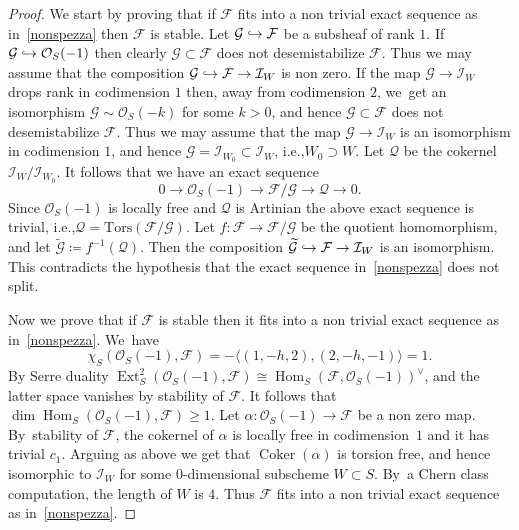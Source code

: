 \documentclass[11pt]{article}
\newcommand{\ie}{i.e.,\xspace}
\newcommand\hto{\mathrel{\lhook\joinrel\to}}
\newcommand\cF{\mathcal{F}}
\newcommand\cG{\mathcal{G}}
\newcommand\cI{\mathcal{I}}
\newcommand\cO{\mathcal{O}}
\newcommand\cQ{\mathcal{Q}}
\DeclareMathOperator{\coker}{Coker}
\DeclareMathOperator{\Ext}{Ext}
\DeclareMathOperator{\Hom}{Hom}
\let\hra\hto
\let\la\langle
\let\wt\widetilde
\theoremstyle{definition}
\begin{document}
\begin{proof}
We start by proving that if $\cF$ fits into a non trivial exact sequence as in~\eqref{nonspezza} then $\cF$ is stable. Let $\cG\hra\cF$ be a subsheaf of rank $1$. If
$\cG\hra\cO_S(-1)$ then clearly $\cG\subset\cF$ does not desemistabilize $\cF$. Thus we may assume that the composition
$\cG\hra\cF\to \cI_W$ is non zero. If the map $\cG\to \cI_W$ drops rank in codimension $1$ then, away from codimension $2$, we~get an isomorphism $\cG\sim\cO_S(-k)$ for some $k>0$, and hence $\cG\subset\cF$ does not desemistabilize $\cF$. Thus we may assume that the map $\cG\to \cI_W$ is an isomorphism in codimension $1$, and hence $\cG=\cI_{W_0}\subset \cI_W$, \ie $W_0\supset W$. Let $\cQ$ be the cokernel $\cI_W/ \cI_{W_0}$. It follows that we have an exact sequence
\begin{equation*}
0\to\cO_S(-1)\to\cF/\cG\to \cQ\to 0.
\end{equation*}
Since $\cO_S(-1)$ is locally free and $\cQ$ is Artinian the above exact sequence is trivial, \ie $\cQ=\mathrm{Tors}(\cF/\cG)$. Let $f\colon\cF\to \cF/\cG$ be the quotient homomorphism, and let $\wt{\cG}\coloneqq f^{-1}(\cQ)$. Then the composition
$\wt{\cG}\hra\cF\to \cI_W$ is an isomorphism. This contradicts the hypothesis that the exact sequence in~\eqref{nonspezza} does not split.

Now we prove that if $\cF$ is stable then it fits into a non trivial exact sequence as in~\eqref{nonspezza}. We~have
\begin{equation*}
\chi_S(\cO_S(-1),\cF)=-\la (1,-h,2),(2,-h,-1)\rangle=1.
\end{equation*}
By Serre duality $\Ext^2_S(\cO_S(-1),\cF)\cong \Hom_S(\cF,\cO_S(-1))^{\vee}$, and the latter space vanishes by stability of $\cF$. It follows that
$\dim\Hom_S(\cO_S(-1),\cF)\ge 1$.
Let $\alpha\colon\cO_S(-1)\to\cF$ be a non zero map. By~stability of $\cF$, the
cokernel of $\alpha$ is locally free in codimension~$1$ and it has trivial $c_1$. Arguing as above we get that $\coker(\alpha)$ is torsion free, and hence isomorphic to $\cI_{W}$ for some $0$-dimensional subscheme $W\subset S$. By~a Chern class computation, the length of $W$ is $4$. Thus $\cF$
fits into a non trivial exact sequence as in~\eqref{nonspezza}.
\end{proof}
\end{document}
